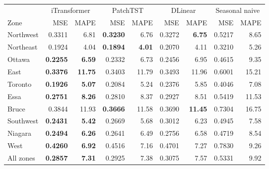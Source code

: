 {\setlength{\tabcolsep}{4pt}%
\begin{tabular}{@{}lrrrrrrrr@{}}
\toprule
 & \multicolumn{2}{c}{iTransformer} & \multicolumn{2}{c}{PatchTST} & \multicolumn{2}{c}{DLinear} & \multicolumn{2}{c}{Seasonal naive} \\
\cmidrule(lr){2-3}\cmidrule(lr){4-5}\cmidrule(lr){6-7}\cmidrule(l){8-9}
Zone & MSE & MAPE & MSE & MAPE & MSE & MAPE & MSE & MAPE \\
\midrule
Northwest & 0.3311 & 6.81 & \textbf{0.3230} & 6.76 & 0.3272 & \textbf{6.75} & 0.5217 & 8.65 \\
Northeast & 0.1924 & 4.04 & \textbf{0.1894} & \textbf{4.01} & 0.2070 & 4.11 & 0.3210 & 5.26 \\
Ottawa & \textbf{0.2255} & \textbf{6.59} & 0.2332 & 6.73 & 0.2456 & 6.95 & 0.4615 & 9.35 \\
East & \textbf{0.3376} & \textbf{11.75} & 0.3403 & 11.79 & 0.3493 & 11.96 & 0.6001 & 15.21 \\
Toronto & \textbf{0.1926} & \textbf{5.07} & 0.2084 & 5.24 & 0.2376 & 5.85 & 0.4046 & 7.08 \\
Essa & \textbf{0.2751} & \textbf{8.26} & 0.2810 & 8.37 & 0.2927 & 8.51 & 0.5419 & 11.53 \\
Bruce & 0.3844 & 11.93 & \textbf{0.3666} & 11.58 & 0.3690 & \textbf{11.45} & 0.7304 & 16.75 \\
Southwest & \textbf{0.2431} & \textbf{5.42} & 0.2669 & 5.68 & 0.3012 & 6.23 & 0.4945 & 7.58 \\
Niagara & \textbf{0.2494} & \textbf{6.26} & 0.2641 & 6.49 & 0.2756 & 6.58 & 0.4719 & 8.54 \\
West & \textbf{0.4260} & \textbf{6.92} & 0.4516 & 7.16 & 0.4701 & 7.27 & 0.7830 & 9.26 \\
\midrule
All zones & \textbf{0.2857} & \textbf{7.31} & 0.2925 & 7.38 & 0.3075 & 7.57 & 0.5331 & 9.92 \\
\bottomrule
\end{tabular}%
}
